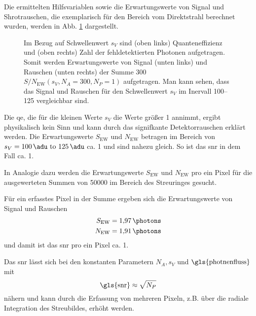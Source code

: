 \noindent
Die ermittelten Hilfsvariablen sowie die Erwartungswerte von Signal und Shrotrauschen, die exemplarisch für den Bereich vom Direktstrahl berechnet wurden, werden in Abb. \ref{fig:qe_fehldetektiert_signal_noise} dargestellt.
\begin{figure}[H]
    \centering
    
    \caption{Im Bezug auf Schwellenwert $s_V$ sind (oben links) Quanteneffizienz und (oben rechts) Zahl der fehldetektierten Photonen aufgetragen. Somit werden Erwartungswerte von Signal (unten links) und Rauschen (unten rechts) der Summe \SI{300}{\captures} $S/N_{\text{EW}}(s_V, N_A = 300, N_P = 1)$ aufgetragen. Man kann sehen, dass das Signal und Rauschen für den Schwellenwert $s_V$ im Inervall \qtyrange{100}{125}{\adu} vergleichbar sind.}
    \label{fig:qe_fehldetektiert_signal_noise}
\end{figure}
\noindent
Die \gls{qe}, die für die kleinen Werte $s_V$ die Werte größer \num{1} annimmt, ergibt physikalisch kein Sinn und kann durch das signifkante Detektorrauschen erklärt werden. Die Erwartungswerte $S_{\text{EW}}$ und $N_{\text{EW}}$ betragen im Bereich von $s_V = \text{\SIrange{100}{125}{\adu}}$ ca. \SI{1}{\photon} und sind nahezu gleich. So ist das \gls{snr} in dem Fall ca. 1.

\noindent
In Analogie dazu werden die Erwartungswerte $S_{\text{EW}}$ und $N_{\text{EW}}$ pro ein Pixel für die ausgewerteten Summen von \SI{50000}{\captures} im Bereich des Streuringes gesucht.

\noindent
Für ein erfasstes Pixel in der Summe ergeben sich die Erwartungswerte von Signal und Rauschen \begin{equation}
    \begin{split}
        S_\text{EW} &= \SI{1.97}{\photons}\\
        N_\text{EW} &= \SI{1.91}{\photons}\\
    \end{split}
\end{equation}
und damit ist das \gls{snr} pro ein Pixel ca. 1.

\noindent
Das \gls{snr} lässt sich bei den konstanten Parametern $N_A, s_V$ und $\text{\gls{photnenfluss}}$ mit
\begin{equation}
    \text{\gls{snr}} \approx \sqrt{N_P}
    \label{eq:snr_pixel}
\end{equation}
nähern und kann durch die Erfassung von mehreren Pixeln, z.B. über die radiale Integration des Streubildes, erhöht werden.

